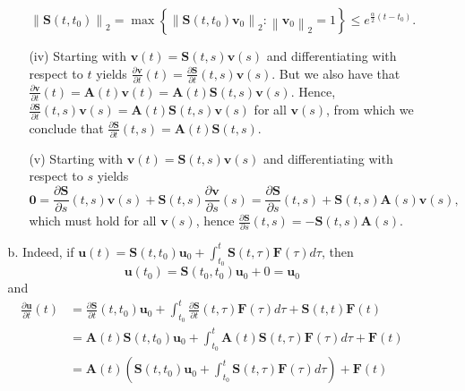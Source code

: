 \documentclass{article}
\begin{document}
\begin{itemize}
\begin{itemize}
\begin{itemize}
\begin{equation*}
\left\lVert \mathbf{S} \left( t, t_0 \right) \right\rVert_2 = \max \left\{ \left\lVert \mathbf{S} \left( t, t_0 \right) \mathbf{v}_0 \right\rVert_2 : \left\lVert \mathbf{v}_0 \right\rVert_2 = 1 \right\} \leq e^{\frac{\alpha}{2} \left( t - t_0 \right)}.
\end{equation*}
\item[(iv)] Starting with $\mathbf{v}(t) = \mathbf{S}(t,s) \mathbf{v}(s)$ and differentiating with respect to $t$ yields $\frac{\partial \mathbf{v}}{\partial t}(t) = \frac{\partial \mathbf{S}}{\partial t}(t,s) \mathbf{v}(s)$. But we also have that $\frac{\partial \mathbf{v}}{\partial t}(t) = \mathbf{A}(t) \mathbf{v}(t) = \mathbf{A}(t) \mathbf{S}(t,s) \mathbf{v}(s)$. Hence, $\frac{\partial \mathbf{S}}{\partial t}(t,s) \mathbf{v}(s) = \mathbf{A}(t) \mathbf{S}(t,s) \mathbf{v}(s)$ for all $\mathbf{v}(s)$, from which we conclude that $\frac{\partial \mathbf{S}}{\partial t}(t,s) = \mathbf{A}(t) \mathbf{S}(t,s)$.
\item[(v)] Starting with $\mathbf{v}(t) = \mathbf{S}(t,s) \mathbf{v}(s)$ and differentiating with respect to $s$ yields
\begin{equation*}
\mathbf{0} = \frac{\partial \mathbf{S}}{\partial s}(t,s) \mathbf{v}(s) + \mathbf{S}(t,s) \frac{\partial \mathbf{v}}{\partial s}(s) = \frac{\partial \mathbf{S}}{\partial s}(t,s) + \mathbf{S}(t,s) \mathbf{A}(s) \mathbf{v}(s),
\end{equation*}
which must hold for all $\mathbf{v}(s)$, hence $\frac{\partial \mathbf{S}}{\partial s}(t,s) = -\mathbf{S}(t,s) \mathbf{A}(s)$.
\end{itemize}
\item[b.] Indeed, if $\mathbf{u}(t) = \mathbf{S} \left( t, t_0 \right) \mathbf{u}_0 + \int_{t_0}^t \mathbf{S}(t,\tau) \mathbf{F}(\tau) d\tau$, then
\begin{equation*}
\mathbf{u} \left( t_0 \right) = \mathbf{S} \left( t_0, t_0 \right) \mathbf{u}_0 + 0 = \mathbf{u}_0
\end{equation*}
and
\begin{align*}
\frac{\partial \mathbf{u}}{\partial t}(t)
& = \frac{\partial \mathbf{S}}{\partial t} \left( t, t_0 \right) \mathbf{u}_0 + \int_{t_0}^t \frac{\partial \mathbf{S}}{\partial t}(t,\tau) \mathbf{F}(\tau) d\tau + \mathbf{S}(t,t) \mathbf{F}(t) \\
& = \mathbf{A}(t) \mathbf{S} \left( t, t_0 \right) \mathbf{u}_0 + \int_{t_0}^t \mathbf{A}(t) \mathbf{S}(t,\tau) \mathbf{F}(\tau) d\tau + \mathbf{F}(t) \\
& = \mathbf{A}(t) \left( \mathbf{S} \left( t, t_0 \right) \mathbf{u}_0 + \int_{t_0}^t \mathbf{S}(t,\tau) \mathbf{F}(\tau) d\tau \right) + \mathbf{F}(t) \\

\end{align*}
\end{itemize}
\end{itemize}
\end{document}

